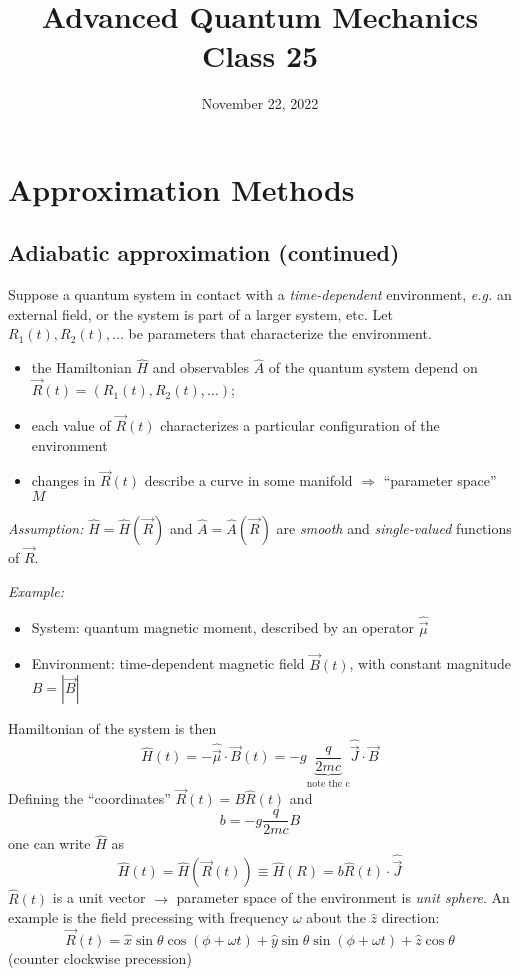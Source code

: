 \documentclass[12pt]{article}
\title{Advanced Quantum Mechanics\\Class 25}
\date{November 22, 2022}                                           %
\newcommand{\be}{\begin{equation}}
\newcommand{\ee}{\end{equation}}
\begin{document}
\maketitle

\setcounter{section}{6}

\section{Approximation Methods}


\setcounter{subsection}{2}
\subsection{Adiabatic approximation (continued)}

Suppose a quantum system in contact with a \emph{time-dependent}
environment, \textit{e.g.} an external field, or the system
is part of a larger system, etc. Let $R_{1}(t), R_{2}(t), \ldots$
be parameters that characterize the environment.
\begin{itemize}
\item the Hamiltonian $\hat{H}$ and observables $\hat{A}$ of the quantum
system depend on $\vec{R}(t)=\left(R_{1}(t), R_{2}(t), \ldots\right)$;
\item each value of $\vec{R}(t)$ characterizes a particular
configuration of the environment
\item changes in $\vec{R}(t)$ describe a curve
in some manifold $\Rightarrow$ ``parameter space'' $M$
\end{itemize}

\emph{Assumption:} $\hat{H}=\hat{H}(\vec{R})$ and $\hat{A}=\hat{A}(\vec{R})$ are \emph{smooth}
and \emph{single-valued} functions of $\vec{R}$.


\emph{Example:}
\begin{itemize}
\item System: quantum magnetic moment,
 described by an operator $\hat{\vec{\mu}}$
\item Environment: time-dependent magnetic field
$\vec{B}(t)$, with constant magnitude $B=|\vec{B}|$
\end{itemize}

\setcounter{equation}{77}
Hamiltonian of the system is then
\be
\hat{H}(t)=-\hat{\vec{\mu}} \cdot \vec{B}(t)=-g \underbrace{\frac{q}{2 m c}}_{\text{note the c}} \hat{\vec{J}} \cdot \vec{B}
\ee	
Defining the ``coordinates'' $\vec{R}(t)=B \hat{R}(t)$ and
\be
b=-g \frac{q}{2 m c} B
\ee
one can write $\hat{H}$ as
\be
\hat{H}(t)=\hat{H}(\vec{R}(t)) \equiv \hat{H}(R)=b \hat{R}(t) \cdot \hat{\vec{J}}
\label{eq:g80}
\ee
$\hat{R}(t)$ is a unit vector $\rightarrow$ parameter space of the
environment is \emph{unit sphere}.
An example is the field precessing with
frequency $\omega$ about the $\hat{z}$ direction:
\be
\vec{R}(t)=\hat{x} \sin \theta \cos (\phi+\omega t)+ \hat{y} \sin \theta \sin (\phi+\omega t)+\hat{z} \cos \theta
\label{eq:g81}
\ee
(counter clockwise precession)
\end{document}
